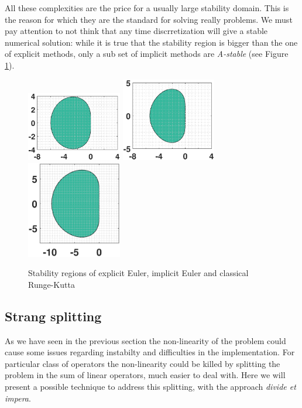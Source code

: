 \documentclass[a4paper,11pt ]{report}
\theoremstyle{definition}
\begin{document}
All these complexities are the price for a usually large stability domain. This is the reason for which they are the standard for solving really  problems.
We must pay attention to not think that any time discrretization will give a stable numerical solution: while it is true that the stability region is bigger than the one of explicit methods, only a sub set of implicit methods are \textit{A-stable} (see Figure \ref{fig:implicit_not_A_stable}).

\begin{figure}
\includegraphics[width=4.15cm]{img/Hammer.eps}
\includegraphics[width=4.15cm]{img/Lobatto_4.eps}
\includegraphics[width=4.15cm]{img/Lobatto_6.eps}
\caption{Stability regions of explicit Euler, implicit Euler and classical Runge-Kutta }
\label{fig:implicit_not_A_stable}
\end{figure}
\subsection{Strang splitting}
As we have seen in the previous section the non-linearity of the problem could cause some issues regarding instabilty and difficulties in the implementation. For particular class of operators the non-linearity could be killed by splitting the problem in the sum of linear operators, much easier to deal with. Here we will present a possible technique to address this splitting, with the approach \textit{divide et impera}.
\end{document}
